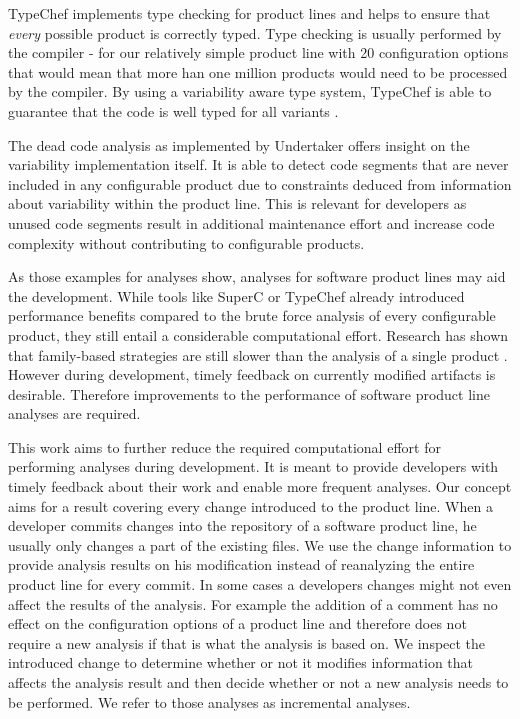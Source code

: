\documentclass[a4paper]{article}
\begin{document}
TypeChef implements type checking for product lines and helps to ensure that \emph{every} possible product is correctly typed. Type checking is usually performed by the compiler - for our relatively simple product line with 20 configuration options that would mean that more han one million products would need to be processed by the compiler. By using a variability aware type system, TypeChef is able to guarantee that the code is well typed for all variants \cite{Kenner:2010:TTT:1868688.1868693}.

The dead code analysis as implemented by Undertaker \cite{Tartler:2011:FCC:1966445.1966451} offers insight on the variability implementation itself. It is able to detect code segments that are never included in any configurable product due to constraints deduced from information about variability within the product line. This is relevant for developers as unused code segments result in additional maintenance effort and increase code complexity without contributing to configurable products.

As those examples for analyses show, analyses for software product lines may aid the development. While tools like SuperC or TypeChef already introduced performance benefits compared to the brute force analysis of every configurable product, they still entail a considerable computational effort. Research has shown that family-based strategies are still slower than the analysis of a single product \cite{Thum:2014:CSA:2620784.2580950}. However during development, timely feedback on currently modified artifacts is desirable. Therefore  improvements to the performance of software product line analyses are required.

This work aims to further reduce the required computational effort for performing analyses during development. It is meant to provide developers with timely feedback about their work and enable more frequent analyses. Our concept aims for a result covering every change introduced to the product line. When a developer commits changes into the repository of a software product line, he usually only changes a part of the existing files. We use the change information to provide analysis results on his modification instead of reanalyzing the entire product line for every commit. In some cases a developers changes might not even affect the results of the analysis. For example the addition of a comment has no effect on the configuration options of a product line and therefore does not require a new analysis if that is what the analysis is based on. We inspect the introduced change to determine whether or not it modifies information that affects the analysis result and then decide whether or not a new analysis needs to be performed. We refer to those analyses as incremental analyses.
\end{document}
